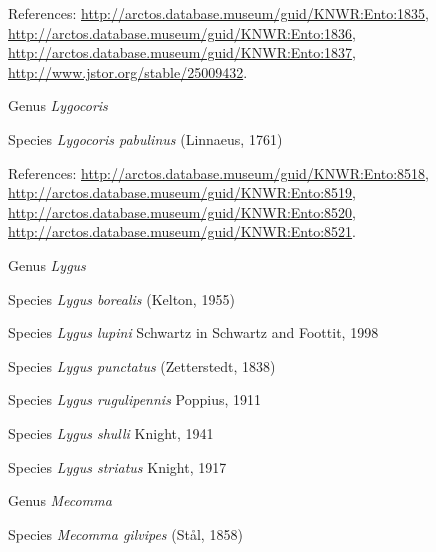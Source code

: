 \documentclass[9pt, article]{memoir}
\begin{document}
\begin{multicols}{2}
References: 
\url{http://arctos.database.museum/guid/KNWR:Ento:1835}, 
\url{http://arctos.database.museum/guid/KNWR:Ento:1836}, 
\url{http://arctos.database.museum/guid/KNWR:Ento:1837}, 
\url{http://www.jstor.org/stable/25009432}.

\vspace{6pt}\noindent\hspace{30pt}Genus \textit{Lygocoris}


\vspace{6pt}\noindent\hspace{36pt}Species \textit{Lygocoris pabulinus} (Linnaeus, 1761)


References: 
\url{http://arctos.database.museum/guid/KNWR:Ento:8518}, 
\url{http://arctos.database.museum/guid/KNWR:Ento:8519}, 
\url{http://arctos.database.museum/guid/KNWR:Ento:8520}, 
\url{http://arctos.database.museum/guid/KNWR:Ento:8521}.

\vspace{6pt}\noindent\hspace{30pt}Genus \textit{Lygus}


\vspace{6pt}\noindent\hspace{36pt}Species \textit{Lygus borealis} (Kelton, 1955)


\vspace{6pt}\noindent\hspace{36pt}Species \textit{Lygus lupini} Schwartz in Schwartz and Foottit, 1998


\vspace{6pt}\noindent\hspace{36pt}Species \textit{Lygus punctatus} (Zetterstedt, 1838)


\vspace{6pt}\noindent\hspace{36pt}Species \textit{Lygus rugulipennis} Poppius, 1911


\vspace{6pt}\noindent\hspace{36pt}Species \textit{Lygus shulli} Knight, 1941


\vspace{6pt}\noindent\hspace{36pt}Species \textit{Lygus striatus} Knight, 1917


\vspace{6pt}\noindent\hspace{30pt}Genus \textit{Mecomma}


\vspace{6pt}\noindent\hspace{36pt}Species \textit{Mecomma gilvipes} (Stål, 1858)



\end{multicols}
\end{document}
